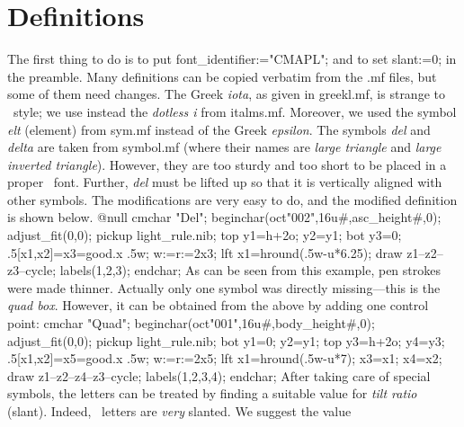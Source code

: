 \section{Definitions}
%
The first thing to do is to put {\sltt font\_identifier:="CMAPL";\/}    %
and to set {\sltt slant:=0;\/} in the preamble. Many definitions can    %
be copied verbatim from the {\sltt .mf\/} files, but some of them
need changes. The Greek {\it iota}, as given in {\sltt greekl.mf},
is strange to \APL\ style; we use instead the {\it dotless i\/}
from {\sltt italms.mf}. Moreover, we used the symbol {\it elt\/}
(element) from {\sltt sym.mf\/} instead of the Greek {\it epsilon}.
The symbols {\it del\/} and {\it delta\/} are
taken from {\sltt symbol.mf\/} (where their names are {\it large triangle\/}
and {\it large inverted triangle}). However, they are too sturdy
and too short to be placed in a proper \APL\ font. Further, {\it del\/}
must be lifted up so that it is vertically aligned with other
symbols. The modifications are very easy to do, and the modified %
definition is shown below.
%
%
\begintt
         @null
         cmchar "Del";
         beginchar(oct"002",16u#,asc_height#,0);
         adjust_fit(0,0); pickup light_rule.nib;
         top y1=h+2o; y2=y1; bot y3=0;
         .5[x1,x2]=x3=good.x .5w; w:=r:=2x3; lft x1=hround(.5w-u*6.25);
         draw z1--z2--z3--cycle;    %
         labels(1,2,3); endchar;
\endtt
As can be seen from this example, pen strokes were made thinner.
Actually only one symbol was directly missing---this is the {\it quad
box}. However, it can be obtained from the above by adding one control point:
\begintt
         cmchar "Quad";
         beginchar(oct"001",16u#,body_height#,0);
         adjust_fit(0,0); pickup light_rule.nib;
         bot y1=0; y2=y1; top y3=h+2o; y4=y3;
         .5[x1,x2]=x5=good.x .5w; w:=r:=2x5;
         lft x1=hround(.5w-u*7);
         x3=x1; x4=x2;
         draw z1--z2--z4--z3--cycle;    %
         labels(1,2,3,4); endchar;
\endtt
After taking care of special symbols, the letters can be treated
by finding a suitable value for {\it tilt ratio\/} (slant). Indeed,
\APL\ letters are {\sl very\/} slanted. We suggest the value
